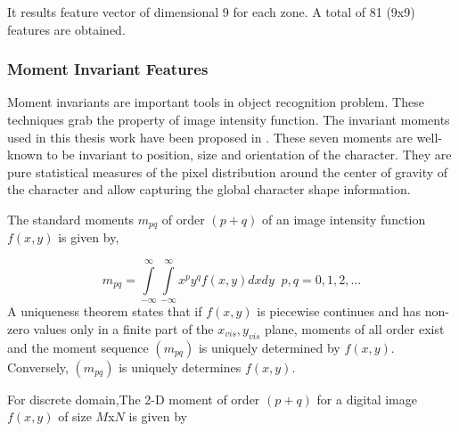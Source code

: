 \documentclass[12pt,a4paper,oneside]{article}
\numberwithin{equation}{section}
\numberwithin{algorithm}{section}
\begin{document}
It results feature vector of dimensional 9 for each zone. A total of 81 (9x9) features are obtained.

\subsubsection{Moment Invariant Features}
\label{moment_invariant_features}
Moment invariants are important tools in object recognition problem. These techniques grab the property of image intensity function.
The invariant moments used in this thesis work have been proposed in \cite{Hu1962}. These seven moments are well-known to be invariant to position, size and orientation of the character. They are pure statistical measures of the pixel distribution around the center of gravity of the character and allow capturing the global character shape information.

The standard moments $m_{pq}$ of order $(p+q)$ of an image intensity function $f(x,y)$ is given by,

\begin{equation}\label{equation_moments}
m_{pq}=\int\limits_{-\infty}^{\infty}\int\limits_{-\infty}^{\infty}x^py^qf(x,y)dxdy \;\;  p,q = 0,1 , 2, ...
\end{equation}
A uniqueness theorem states that if $f(x,y)$ is piecewise continues and has non-zero values only in a finite part of the $x_{vis},y_{vis}$ plane, moments of all order exist and the moment sequence $(m_{pq})$ is uniquely determined by $f(x,y)$. Conversely, $(m_{pq})$ is uniquely determines $f(x,y)$.

For discrete domain,The 2-D moment of order $(p+q)$ for a digital image $f(x,y)$ of size $M$x$N$ is given by
\end{document}
